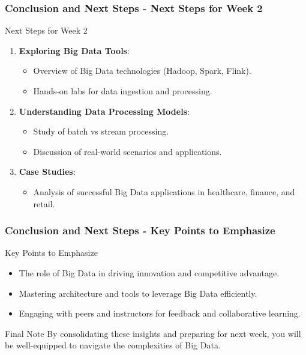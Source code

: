 \documentclass[aspectratio=169]{beamer}
\begin{document}
\begin{frame}[fragile]
    \frametitle{Conclusion and Next Steps - Next Steps for Week 2}
    \begin{block}{Next Steps for Week 2}
        \begin{enumerate}
            \item \textbf{Exploring Big Data Tools}:
            \begin{itemize}
                \item Overview of Big Data technologies (Hadoop, Spark, Flink).
                \item Hands-on labs for data ingestion and processing.
            \end{itemize}
            
            \item \textbf{Understanding Data Processing Models}:
            \begin{itemize}
                \item Study of batch vs stream processing.
                \item Discussion of real-world scenarios and applications.
            \end{itemize}
            
            \item \textbf{Case Studies}:
            \begin{itemize}
                \item Analysis of successful Big Data applications in healthcare, finance, and retail.
            \end{itemize}
        \end{enumerate}
    \end{block}
\end{frame}

\begin{frame}[fragile]
    \frametitle{Conclusion and Next Steps - Key Points to Emphasize}
    \begin{block}{Key Points to Emphasize}
        \begin{itemize}
            \item The role of Big Data in driving innovation and competitive advantage.
            \item Mastering architecture and tools to leverage Big Data efficiently.
            \item Engaging with peers and instructors for feedback and collaborative learning.
        \end{itemize}
    \end{block}
    \begin{block}{Final Note}
        By consolidating these insights and preparing for next week, you will be well-equipped to navigate the complexities of Big Data.
    \end{block}
\end{frame}
\end{document}
